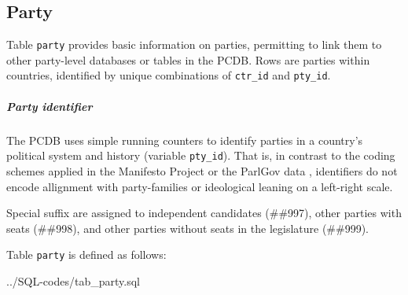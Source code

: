 \subsection{Party}\label{subsec_tab_party}
Table \texttt{\footnotesize party} provides basic information on parties, permitting to link them to other party-level databases or tables in the PCDB. 
Rows are parties within countries, identified by unique combinations of  \texttt{\footnotesize ctr\_id} and \texttt{\footnotesize pty\_id}.

\subparagraph{Party identifier}
The PCDB uses simple running counters to identify parties in a country's political system and history (variable \texttt{\footnotesize pty\_id}).
That is, in contrast to the coding schemes applied in the Manifesto Project \citep{ManifestoData2013} or the ParlGov data \citep{ParlGov2012}, identifiers do not encode allignment with party-families or ideological leaning on a left-right scale.

Special suffix are assigned to
independent candidates (\#\#997), 
other parties with seats (\#\#998), and 
other parties without seats in the legislature (\#\#999).
  
Table \texttt{\footnotesize party} is defined as follows: 

%
{../SQL-codes/tab_party.sql}




